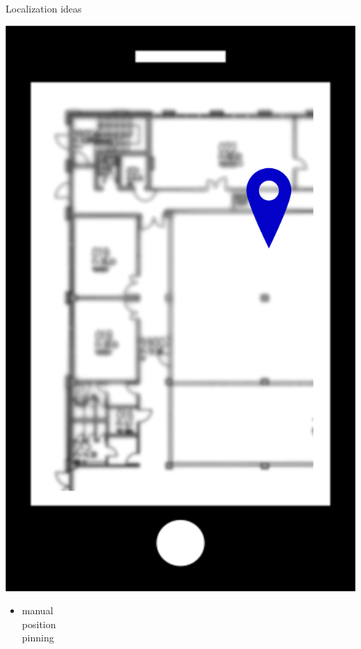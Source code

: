 \documentclass[11pt]{beamer}
\begin{document}
\begin{frame}{Localization ideas}

\begin{center}
        \begin{minipage}[b]{0.45\linewidth}
            \begin{minipage}[b]{0.45\linewidth}
                \includegraphics[width=\textwidth]{localisation_manual}
            \end{minipage}%
            \begin{minipage}[b]{0.75\linewidth}
                \begin{itemize}
                    \item manual \\position \\pinning

\end{itemize}
\end{minipage}
\end{minipage}
\end{center}
\end{frame}
\end{document}
